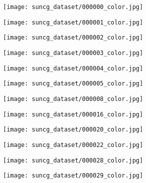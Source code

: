\begin{figure}[h!]
  \centering
  \begin{subfigure}[b]{0.32\linewidth}
    \texttt{[image: suncg\_dataset/000000\_color.jpg]}
  \end{subfigure}
  \begin{subfigure}[b]{0.32\linewidth}
    \texttt{[image: suncg\_dataset/000001\_color.jpg]}
  \end{subfigure}
  \begin{subfigure}[b]{0.32\linewidth}
    \texttt{[image: suncg\_dataset/000002\_color.jpg]}
  \end{subfigure}
  \begin{subfigure}[b]{0.32\linewidth}
    \texttt{[image: suncg\_dataset/000003\_color.jpg]}
  \end{subfigure}
  \begin{subfigure}[b]{0.32\linewidth}
    \texttt{[image: suncg\_dataset/000004\_color.jpg]}
  \end{subfigure}
  \begin{subfigure}[b]{0.32\linewidth}
    \texttt{[image: suncg\_dataset/000005\_color.jpg]}
  \end{subfigure}
  \begin{subfigure}[b]{0.32\linewidth}
    \texttt{[image: suncg\_dataset/000008\_color.jpg]}
  \end{subfigure}
  \begin{subfigure}[b]{0.32\linewidth}
    \texttt{[image: suncg\_dataset/000016\_color.jpg]}
  \end{subfigure}
  \begin{subfigure}[b]{0.32\linewidth}
    \texttt{[image: suncg\_dataset/000020\_color.jpg]}
  \end{subfigure}
  \begin{subfigure}[b]{0.32\linewidth}
    \texttt{[image: suncg\_dataset/000022\_color.jpg]}
  \end{subfigure}
  \begin{subfigure}[b]{0.32\linewidth}
    \texttt{[image: suncg\_dataset/000028\_color.jpg]}
  \end{subfigure}
  \begin{subfigure}[b]{0.32\linewidth}
    \texttt{[image: suncg\_dataset/000029\_color.jpg]}
  \end{subfigure}
  \begin{subfigure}[b]{0.32\linewidth}

\end{subfigure}
\end{figure}
